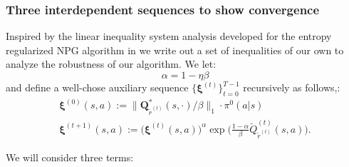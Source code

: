 \subsubsection{Three interdependent sequences to show convergence}

Inspired by the linear inequality system analysis developed for the entropy regularized NPG algorithm in \cite{Cen2021} we write out a set of inequalities of our own to analyze the robustness of our algorithm. We let: \[\alpha=1-\eta\beta\] and define a well-chose auxiliary sequence $\big\{\bm{\xi}^{(t)}\big\}_{t=0}^{T-1}$ recursively as follows,:
\begin{align}
    \label{eq:aux_seq_init}
    \bm{\xi}^{(0)}(s,a) := \|\bm{Q}^*_{\tilde{r}^{(t)}}(s,\cdot)/\beta\|_1 \cdot \pi^{0}(a|s) \\
    \label{eq:aux_seq_step}
    \bm{\xi}^{(t+1)}(s,a) := \bigl(\bm{\xi}^{(t)}(s,a) \bigr)^\alpha \exp\Bigg( \frac{1-\alpha}{\beta} \breve{Q}^{(t)}_{\tilde{r}^{(t)}}(s,a) \Bigg).
\end{align}

We will consider three terms:


